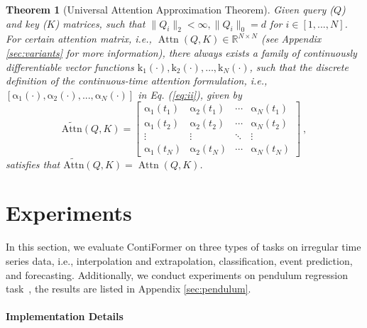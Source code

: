 \documentclass{article}
\newtheorem{theorem}{Theorem}
\begin{document}
\begin{theorem}[Universal Attention Approximation Theorem]
Given query ($Q$) and key ($K$) matrices, such that $\|Q_i\|_2 < \infty, \|Q_i\|_0 = d$ for $i \in [1, ..., N]$.
For certain attention matrix, i.e., $\operatorname{Attn}(Q, K) \in \mathbb{R}^{N \times N}$ (see Appendix \ref{sec:variants} for more information), there always exists a family of continuously differentiable vector functions $\boldsymbol{\mathrm{k}}_1(\cdot), \boldsymbol{\mathrm{k}}_2(\cdot), \ldots, \boldsymbol{\mathrm{k}}_N(\cdot)$, such that the discrete definition of the continuous-time attention formulation, i.e., $[\boldsymbol{\mathrm{\alpha}}_1(\cdot), \boldsymbol{\mathrm{\alpha}}_2(\cdot), ..., \boldsymbol{\mathrm{\alpha}}_N(\cdot)]$ in Eq. (\ref{eq:ii}), given by
\begin{equation}
\operatorname{\widetilde{Attn}}(Q, K)=\left[\begin{array}{cccc}
\boldsymbol{\mathrm{\alpha}}_1(t_1) & \boldsymbol{\mathrm{\alpha}}_2(t_1) & \cdots & \boldsymbol{\mathrm{\alpha}}_N(t_1) \\
\boldsymbol{\mathrm{\alpha}}_1(t_2) & \boldsymbol{\mathrm{\alpha}}_2(t_2) & \cdots & \boldsymbol{\mathrm{\alpha}}_N(t_2) \\
\vdots & \vdots & \ddots & \vdots \\
\boldsymbol{\mathrm{\alpha}}_1(t_N) & \boldsymbol{\mathrm{\alpha}}_2(t_N) & \cdots & \boldsymbol{\mathrm{\alpha}}_N(t_N)
\end{array}\right] ~,
\label{eq:proof}
\end{equation}
satisfies that $\operatorname{\widetilde{Attn}}(Q, K) = \operatorname{Attn}(Q, K)$.
\end{theorem}

\section{Experiments}

In this section, we evaluate ContiFormer on three types of tasks 
on irregular time series data, 
i.e., interpolation and extrapolation, classification, event prediction, and forecasting. Additionally, we conduct experiments on pendulum regression task~\cite{schirmer2022modeling, gu2021efficiently}, the results are listed in Appendix \ref{sec:pendulum}.

\paragraph{Implementation Details}
\end{document}
